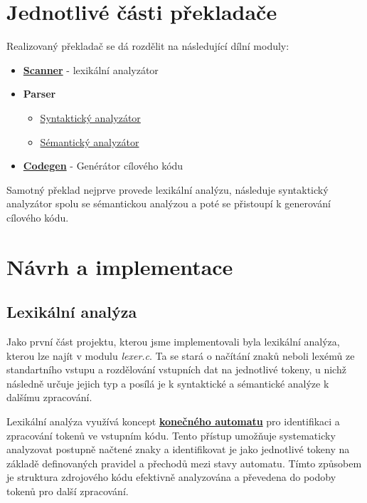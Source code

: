 \documentclass[a4paper, 12pt]{article} %
\begin{document}
    \section{Jednotlivé části překladače}
    Realizovaný překladač se dá rozdělit na následující dílní moduly:
    \begin{itemize}[noitemsep]
        \item \hyperref[lexer]{\textbf{Scanner}} - lexikální analyzátor
        \item \textbf{Parser}
            \begin{itemize}
                \item \hyperref[syntactics]{Syntaktický analyzátor}
                \item \hyperref[semantics]{Sémantický analyzátor}
            \end{itemize}
        \item \hyperref[codegen]{\textbf{Codegen}} - Genérátor cílového kódu
    \end{itemize}
    Samotný překlad nejprve provede lexikální analýzu, následuje syntaktický 
    analyzátor spolu se sémantickou analýzou a poté se přistoupí k generování 
    cílového kódu. 

    \section{Návrh a implementace} \label{lexer}
        \subsection{Lexikální analýza}
            Jako první část projektu, kterou jsme implementovali byla lexikální analýza, kterou
            lze najít v modulu \textit{lexer.c}. Ta se
            stará o načítání znaků neboli lexémů ze standartního vstupu a rozdělování vstupních dat na 
            jednotlivé tokeny, u nichž následně určuje jejich typ a posílá 
            je k syntaktické a sémantické analýze k 
            dalšímu zpracování. 

            Lexikální analýza využívá koncept \hyperref[kodiagram]{\textbf{konečného automatu}} pro 
            identifikaci a zpracování tokenů ve vstupním kódu. Tento přístup umožňuje systematicky 
            analyzovat postupně načtené znaky a identifikovat je jako jednotlivé tokeny na základě 
            definovaných pravidel a přechodů mezi stavy automatu. Tímto způsobem je struktura 
            zdrojového kódu efektivně analyzována a převedena do podoby tokenů pro další zpracování. 
\end{document}
